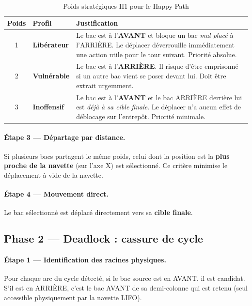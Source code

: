 \documentclass[12pt,a4paper]{article}
\begin{document}
\begin{table}[H]
\centering
\renewcommand{\arraystretch}{1.35}
\begin{tabular}{c >{\bfseries}l p{9cm}}
\toprule
Poids & Profil & Justification \\
\midrule
1 & Libérateur &
  Le bac est à l'\textbf{AVANT} et bloque un bac \emph{mal placé} à
  l'ARRIÈRE. Le déplacer déverrouille immédiatement une action utile
  pour le tour suivant. Priorité absolue. \\
2 & Vulnérable &
  Le bac est à l'\textbf{ARRIÈRE}. Il risque d'être emprisonné si un
  autre bac vient se poser devant lui. Doit être extrait urgemment. \\
3 & Inoffensif &
  Le bac est à l'\textbf{AVANT} et le bac ARRIÈRE derrière lui est
  \emph{déjà à sa cible finale}. Le déplacer n'a aucun effet de
  déblocage sur l'entrepôt. Priorité minimale. \\
\bottomrule
\end{tabular}
\caption{Poids stratégiques H1 pour le Happy Path}
\end{table}

\paragraph{Étape 3 — Départage par distance.}
Si plusieurs bacs partagent le même poids, celui dont la position
est la \textbf{plus proche de la navette} (sur l'axe X) est sélectionné.
Ce critère minimise le déplacement à vide de la navette.

\paragraph{Étape 4 — Mouvement direct.}
Le bac sélectionné est déplacé directement vers sa \textbf{cible finale}.

\subsection{Phase 2 — Deadlock : cassure de cycle}

\paragraph{Étape 1 — Identification des racines physiques.}
Pour chaque arc du cycle détecté, si le bac source est en AVANT,
il est candidat. S'il est en ARRIÈRE, c'est le bac AVANT de sa
demi-colonne qui est retenu (seul accessible physiquement par la
navette LIFO).
\end{document}
